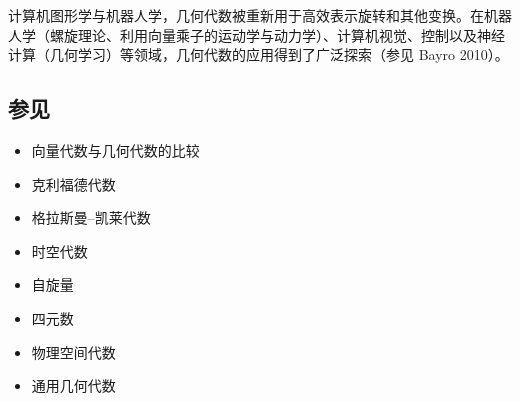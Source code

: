 计算机图形学与机器人学，几何代数被重新用于高效表示旋转和其他变换。在机器人学（螺旋理论、利用向量乘子的运动学与动力学）、计算机视觉、控制以及神经计算（几何学习）等领域，几何代数的应用得到了广泛探索（参见 Bayro 2010）。
\subsection{参见}
\begin{itemize}
\item 向量代数与几何代数的比较
\item 克利福德代数
\item 格拉斯曼–凯莱代数
\item 时空代数
\item 自旋量
\item 四元数
\item 物理空间代数
\item 通用几何代数
\end{itemize}
